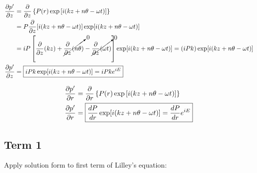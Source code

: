 \documentclass[]{aiaa-tc}%
\begin{document}
\begin{equation} \label{dpdz}
\begin{split}
\dfrac{\partial p'}{\partial z} &= \dfrac{\partial}{\partial z}
  \left\{ P(r) \exp\left[ i(kz + n\theta -\omega t) \right]\right\} \\
&= P \dfrac{\partial}{\partial z} [i(kz + n\theta -\omega t)] \exp[i(kz + n\theta -\omega t)] \\
&= iP \left[             \dfrac{\partial}{\partial z}(kz)
          + \cancelto{0}{\dfrac{\partial}{\partial z}(n\theta)}
          - \cancelto{0}{\dfrac{\partial}{\partial z}(\omega t)}
    \right] \exp[i(kz + n\theta -\omega t)]
    = (iPk) \exp[i(kz + n\theta -\omega t)] \\
\dfrac{\partial p'}{\partial z} &= \boxed{iPk \exp[i(kz + n\theta -\omega t)] = iPk e^{iE} }
\end{split}
\end{equation}

\begin{equation} \label{dpdr}
\begin{split}
\dfrac{\partial p'}{\partial r} &= \dfrac{\partial}{\partial r}
  \left\{ P(r) \exp\left[ i(kz + n\theta -\omega t) \right]\right\} \\
\dfrac{\partial p'}{\partial r} &= \boxed{\dfrac{dP}{dr} \exp[i(kz + n\theta -\omega t)] = \dfrac{dP}{dr} e^{iE} }
\end{split}
\end{equation}

\subsection{Term 1}

Apply solution form to first term of Lilley's equation:

\end{document}
